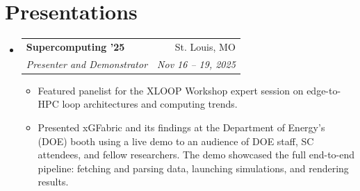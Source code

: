 \documentclass[letterpaper,11pt]{article}
\makeatletter
\newcommand{\docSubheading}[4]{
  \vspace{-2pt}
\item
  \begin{tabular*}{\textwidth}[t]{l@{\extracolsep{\fill}}r}
    \textbf{#1} & #2 \\
    \small\textit{#3} & \small \textit{#4} \\
  \end{tabular*}\vspace{-7pt}
}
\newcommand{\docSubHeadingListStart}{\begin{itemize}[leftmargin=0in, label={}]}
\newcommand{\docSubHeadingListEnd}{\end{itemize}\vspace{-5pt}}
\makeatother
\begin{document}
\section{Presentations}
  \docSubHeadingListStart
    \docSubheading
      {Supercomputing '25}{St. Louis, MO}
      {Presenter and Demonstrator}{Nov 16 -- 19, 2025}\vspace*{-5pt}
      \begin{small}
        \begin{itemize}[itemindent=0pt]
          \item Featured panelist for the XLOOP Workshop expert session on edge-to-HPC loop architectures and computing trends.
          \item Presented xGFabric and its findings at the Department of Energy's (DOE) booth using a live demo to an audience of DOE staff, SC attendees, and fellow researchers. The demo showcased the full end-to-end pipeline: fetching and parsing data, launching simulations, and rendering results.
        \end{itemize}
      \end{small}
  \docSubHeadingListEnd
\end{document}
